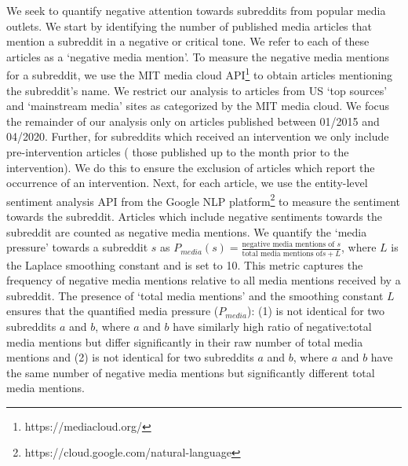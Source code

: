  We seek to
quantify negative attention towards subreddits from popular media outlets. We
start by identifying the number of published media articles that mention
a subreddit in a negative or critical tone. We refer to each of these articles
as a `negative media mention'. To measure the negative media mentions for
a subreddit, we use the MIT media cloud API\footnote{https://mediacloud.org/}
to obtain articles mentioning the subreddit's name. We restrict our analysis to
articles from US `top sources' and `mainstream media' sites as categorized by
the MIT media cloud. We focus the remainder of our analysis only
on articles published between 01/2015 and 04/2020. Further, for subreddits
which received an intervention we only include pre-intervention articles (\ie
those published up to the month prior to the intervention). We do this to
ensure the exclusion of articles which report the occurrence of an
intervention. Next, for each article, we use the entity-level sentiment
analysis API from the Google NLP
platform\footnote{https://cloud.google.com/natural-language} to measure the
sentiment towards the subreddit. Articles which include negative sentiments
towards the subreddit are counted as negative media mentions. We quantify the
`media pressure' towards a subreddit $s$ as $P_{media}(s)
= \frac{\text{negative media mentions of }s}{\text{total media mentions of
}s+L}$, where $L$ is the Laplace smoothing constant and is set to 10. This
metric captures the frequency of negative media mentions relative to all media
mentions received by a subreddit. %
The presence of `total media mentions' and the smoothing constant $L$
ensures that the quantified media pressure ($P_{media}$): (1) is not identical
for two subreddits $a$ and $b$, where $a$ and $b$ have similarly high ratio of
negative:total media mentions but differ significantly in their raw number of
total media mentions and (2) is not identical for two subreddits $a$ and
$b$, where $a$ and $b$ have the same number of negative media mentions but
significantly different total media mentions.


